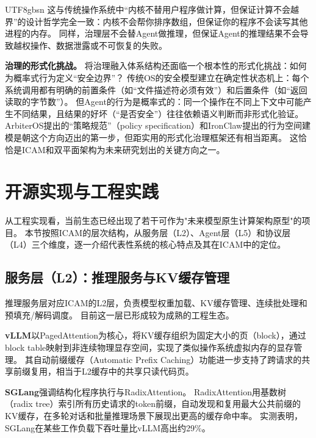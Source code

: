 \documentclass[11pt,a4paper]{article}
\begin{document}
\begin{CJK*}{UTF8}{gbsn}
这与传统操作系统中``内核不替用户程序做计算，但保证计算不会越界''的设计哲学完全一致\cite{ostep_2023}：内核不会帮你排序数组，但保证你的程序不会读写其他进程的内存。
同样，治理层不会替Agent做推理，但保证Agent的推理结果不会导致越权操作、数据泄露或不可恢复的失败。

\textbf{治理的形式化挑战。}
将治理融入体系结构还面临一个根本性的形式化挑战：如何为概率式行为定义``安全边界''？
传统OS的安全模型建立在确定性状态机上：每个系统调用都有明确的前置条件（如``文件描述符必须有效''）和后置条件（如``返回读取的字节数''）。
但Agent的行为是概率式的：同一个操作在不同上下文中可能产生不同结果，且结果的好坏（``是否安全''）往往依赖语义判断而非形式化验证。
ArbiterOS\cite{arbiteros2025}提出的``策略规范''（policy specification）和IronClaw\cite{ironclaw2025}提出的行为空间建模是朝这个方向迈出的第一步，但距实用的形式化治理框架还有相当距离。
这恰恰是ICAM和双平面架构为未来研究划出的关键方向之一。%
\section{开源实现与工程实践}
\label{sec:implementation}

从工程实现看，当前生态已经出现了若干可作为"未来模型原生计算架构原型"的项目。
本节按照ICAM的层次结构，从服务层（L2）、Agent层（L5）和协议层（L4）三个维度，逐一介绍代表性系统的核心特点及其在ICAM中的定位。

\subsection{服务层（L2）：推理服务与KV缓存管理}

推理服务层对应ICAM的L2层，负责模型权重加载、KV缓存管理、连续批处理和预填充/解码调度。
目前这一层已形成较为成熟的工程生态。

\textbf{vLLM}以PagedAttention为核心，将KV缓存组织为固定大小的页（block），通过block table映射到非连续物理显存空间，实现了类似操作系统虚拟内存的显存管理\cite{kwon2023pagedattention,vllm_docs_2026}。
其自动前缀缓存（Automatic Prefix Caching）功能进一步支持了跨请求的共享前缀复用，相当于L2缓存中的共享只读代码页\cite{vllm_prefix_2026}。

\textbf{SGLang}强调结构化程序执行与RadixAttention\cite{sglang2024,sglang_docs_2026}。
RadixAttention用基数树（radix tree）索引所有历史请求的token前缀，自动发现和复用最大公共前缀的KV缓存，在多轮对话和批量推理场景下展现出更高的缓存命中率。
实测表明，SGLang在某些工作负载下吞吐量比vLLM高出约29\%\cite{sglang2024}。


\end{CJK*}
\end{document}
